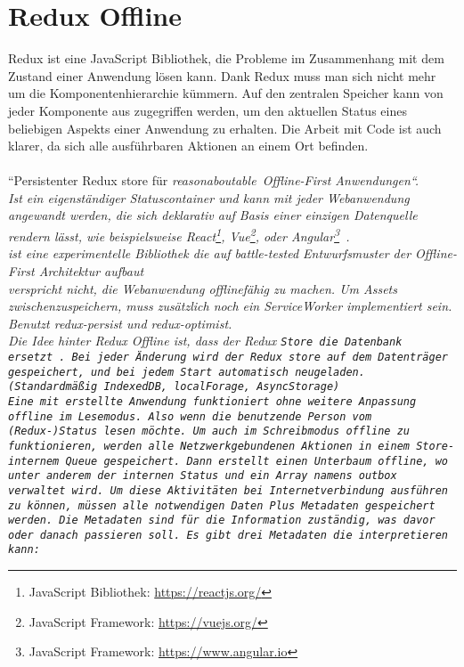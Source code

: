 \section{\label{sub:reduxoffline}Redux Offline}
%
%
%
Redux ist eine JavaScript Bibliothek, die Probleme im Zusammenhang mit dem Zustand einer Anwendung lösen kann. Dank Redux muss man sich nicht mehr um die Komponentenhierarchie kümmern. Auf den zentralen Speicher kann von jeder Komponente aus zugegriffen werden, um den aktuellen Status eines beliebigen Aspekts einer Anwendung zu erhalten. Die Arbeit mit Code ist auch klarer, da sich alle ausführbaren Aktionen an einem Ort befinden.\\\\
%
%
%
``Persistenter Redux store für \it{reasonaboutable}\texttrademark ~Offline-First Anwendungen``. \\
Ist ein eigenständiger Statuscontainer und kann mit jeder Webanwendung angewandt werden, die sich \it{deklarativ auf Basis einer einzigen Datenquelle rendern lässt}, wie beispielsweise React\footnote{JavaScript Bibliothek: \url{https://reactjs.org/}}, Vue\footnote{JavaScript Framework: \url{https://vuejs.org/}}, oder Angular\footnote{JavaScript Framework: \url{https://www.angular.io}}~\cite{redux-offline-compabilaty}.\\
ist eine experimentelle Bibliothek die auf \it{battle-tested} Entwurfsmuster der Offline-First Architektur aufbaut\\
 verspricht nicht, die Webanwendung offlinefähig zu machen. Um \gls{Assets} zwischenzuspeichern, muss zusätzlich noch ein ServiceWorker implementiert sein.\\
Benutzt redux-persist und redux-optimist.\\
Die Idee hinter Redux Offline ist, dass der Redux \tt{Store} die Datenbank ersetzt~\cite{redux-offline}.
Bei jeder Änderung wird der Redux store auf dem Datenträger gespeichert, und bei jedem Start automatisch neugeladen. (Standardmäßig IndexedDB, localForage, AsyncStorage)\\
Eine mit  erstellte Anwendung funktioniert ohne weitere Anpassung offline im Lesemodus. Also wenn die benutzende Person vom (Redux-)Status lesen möchte.
Um auch im Schreibmodus offline zu funktionieren, werden alle Netzwerkgebundenen Aktionen in einem Store-internem \gls{Queue} gespeichert. Dann erstellt  einen Unterbaum \tt{offline}, wo unter anderem der internen Status und ein Array namens \tt{outbox} verwaltet wird. Um diese Aktivitäten bei Internetverbindung ausführen zu können, müssen alle notwendigen Daten Plus Metadaten gespeichert werden. Die Metadaten sind für die Information zuständig, was davor oder danach passieren soll. Es gibt drei Metadaten die  interpretieren kann:\\
